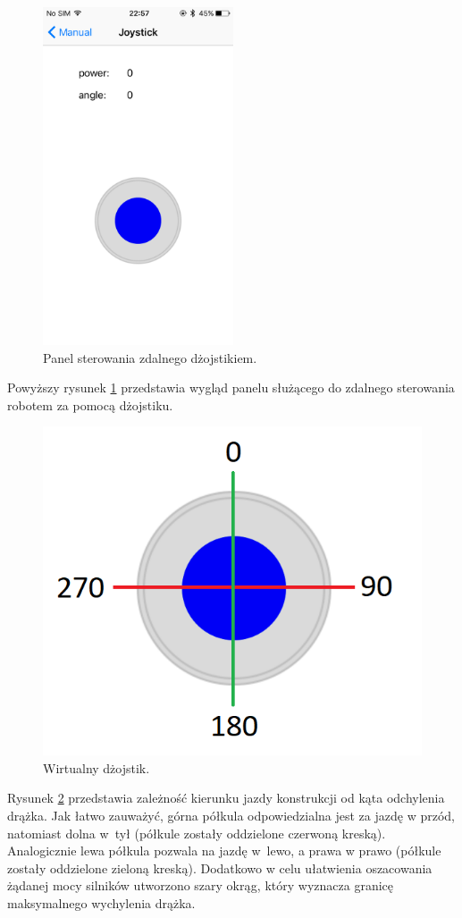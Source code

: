 \begin{figure}[H]
	\centering
		\includegraphics[width=0.75\linewidth, height=10cm, keepaspectratio, fbox]{pic05/joystick.PNG}
	\caption{Panel sterowania zdalnego dżojstikiem.}
	\label{fig:joystickview}	
\end{figure}

Powyższy rysunek \ref{fig:joystickview} przedstawia wygląd panelu służącego do zdalnego sterowania robotem za pomocą dżojstiku.

\begin{figure}[H]
	\centering
		\includegraphics[width=0.75\linewidth]{pic05/joy.png}
	\caption{Wirtualny dżojstik.}
	\label{fig:joystickdirections}	
\end{figure}

Rysunek \ref{fig:joystickdirections} przedstawia zależność kierunku jazdy konstrukcji od kąta odchylenia drążka. Jak łatwo zauważyć, górna półkula odpowiedzialna jest za jazdę w przód, natomiast dolna w~tył (półkule zostały oddzielone czerwoną kreską). Analogicznie lewa półkula pozwala na jazdę w~lewo, a prawa w prawo (półkule zostały oddzielone zieloną kreską). Dodatkowo w celu ułatwienia oszacowania żądanej mocy silników utworzono szary okrąg, który wyznacza granicę maksymalnego wychylenia drążka.

